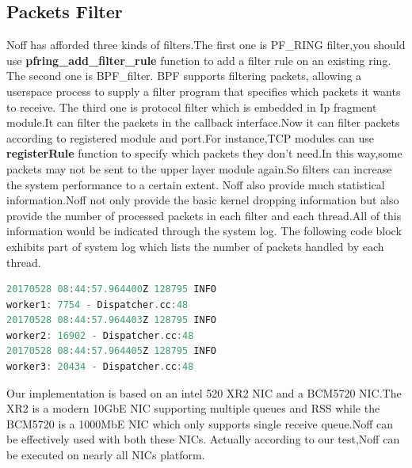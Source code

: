 \documentclass[conference]{IEEEtran}
\begin{document}
\subsection{Packets Filter}
Noff has afforded three kinds of filters.The first one is PF\_RING filter,you should use \textbf{pfring\_add\_filter\_rule} function to add a filter rule on an existing ring.
The second one is BPF\_filter. BPF supports filtering packets, allowing a userspace process to supply a filter program that specifies which packets it wants to receive.
The third one is protocol filter which is embedded in Ip fragment module.It can filter the packets in the callback interface.Now it can filter packets according to registered module and port.For instance,TCP modules can use \textbf{registerRule} function to specify which packets they don't need.In this way,some packets may not be sent to the upper layer module again.So filters can increase the system performance to a certain extent.
\newline\indent Noff also provide much statistical information.Noff not only provide the basic kernel dropping information but also provide the number of processed packets in each filter and each thread.All of this information would be indicated through the system log. The following code block exhibits part of system log which lists the number of packets handled by each thread.
\begin{lstlisting}[language=C]
20170528 08:44:57.964400Z 128795 INFO
worker1: 7754 - Dispatcher.cc:48
20170528 08:44:57.964403Z 128795 INFO
worker2: 16902 - Dispatcher.cc:48
20170528 08:44:57.964405Z 128795 INFO
worker3: 20434 - Dispatcher.cc:48
\end{lstlisting}
\indent Our implementation is based on an intel 520 XR2 NIC and a BCM5720 NIC.The XR2 is a modern 10GbE NIC supporting multiple queues and RSS while the BCM5720 is a 1000MbE NIC which only supports single receive queue.Noff can be effectively used with both these NICs. Actually according to our test,Noff can be executed on nearly all NICs platform.
\end{document}
